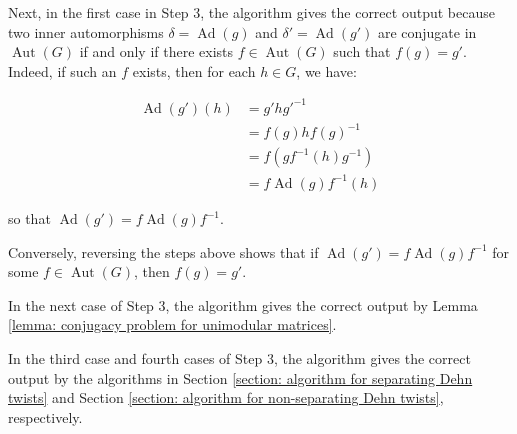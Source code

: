 \documentclass{amsart}
\DeclareMathOperator{\Aut}{Aut}
\DeclareMathOperator{\Ad}{Ad}
\theoremstyle{plain}
\theoremstyle{definition}
\theoremstyle{remark}
\begin{document}
Next, in the first case in Step 3, the algorithm gives the correct output because two inner automorphisms $\delta = \Ad(g)$ and $\delta' = \Ad(g')$ are conjugate in $\Aut(G)$ if and only if there exists $f \in \Aut(G)$ such that $f(g) = g'$. Indeed, if such an $f$ exists, then for each $h \in G$, we have: 

\begin{align*}
    \Ad(g') (h) &= g'hg'^{-1} \\
    &= f(g) h f(g)^{-1} \\
    &= f(gf^{-1}(h) g^{-1}) \\
    &= f \Ad(g) f^{-1} (h)
\end{align*}

so that $\Ad(g') = f \Ad(g) f^{-1}$. 

Conversely, reversing the steps above shows that if $\Ad(g') = f \Ad(g) f^{-1}$ for some $f \in \Aut(G)$, then $f(g) = g'$. 

In the next case of Step 3, the algorithm gives the correct output by Lemma \ref{lemma: conjugacy problem for unimodular matrices}. 

In the third case and fourth cases of Step 3, the algorithm gives the correct output by the algorithms in Section \ref{section: algorithm for separating Dehn twists} and Section \ref{section: algorithm for non-separating Dehn twists}, respectively. 
 









 
\end{document}
